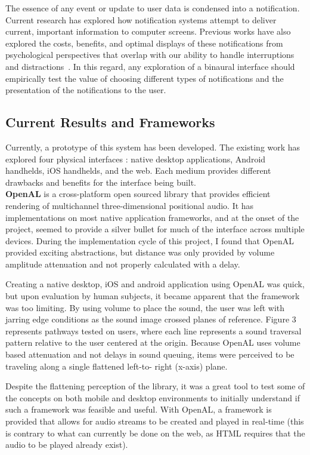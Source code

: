 The essence of any event or update to user data is condensed into a
notification.  Current research has explored how notification systems attempt to
deliver current, important information to computer screens.  Previous works have
also explored the costs, benefits, and optimal displays of these notifications
from psychological perspectives that overlap with our ability to handle
interruptions and distractions~\cite{McCrickard2003509,
cutrell2001notification}. In this regard, any exploration of a binaural interface
should empirically test the value of choosing different types of notifications 
and the presentation of the notifications to the user.


\subsection{                  Current Results and Frameworks                  }

Currently, a prototype of this system has been developed.  The existing work
has explored four physical interfaces : native desktop applications, Android
handhelds, iOS handhelds, and the web. Each medium provides different drawbacks
and benefits for the interface being built.\\

\textbf{OpenAL} is a cross-platform open sourced library that provides
efficient rendering of multichannel three-dimensional positional audio.  It has
implementations on most native  application frameworks, and at the onset of the
project, seemed to provide a silver bullet for much of the interface across
multiple devices.  During the implementation cycle of this project, I found
that OpenAL provided exciting abstractions, but distance was only provided by
volume amplitude attenuation and not properly calculated with a delay.

Creating a native desktop, iOS and android application using OpenAL was quick,
but upon evaluation by  human subjects, it became apparent that the framework
was too limiting.  By using volume to place the sound, the user was left with
jarring edge conditions as the sound image crossed planes of reference.
Figure 3 represents pathways tested on users, where each line
represents a sound traversal pattern relative to the user centered at the
origin. Because OpenAL uses volume based attenuation and not delays in sound
queuing, items were perceived to be traveling along a single flattened left-to-
right (x-axis) plane.

Despite the flattening perception of the library, it was a great tool to test
some of the concepts on both mobile and desktop environments to initially
understand if such a framework was feasible and useful.  With OpenAL, a
framework is provided that allows for audio streams to be created and played in
real-time (this is contrary to what can currently be done on the web, as HTML
requires that the audio to be played already exist).

